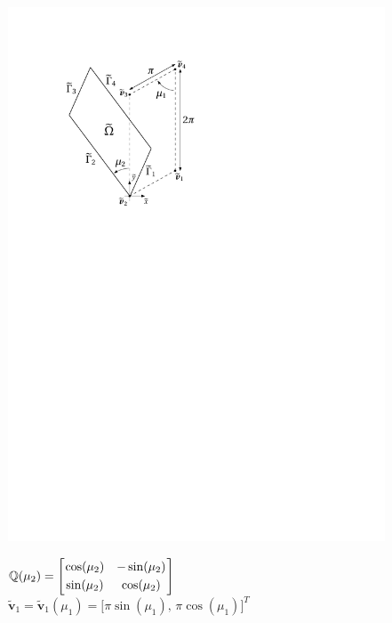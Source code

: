 \documentclass[12pt, a4paper, twoside, openright]{report}
\numberwithin{equation}{chapter}
\theoremstyle{theorem}
\theoremstyle{definition}
\theoremstyle{remark}
\theoremstyle{proposition}
\numberwithin{figure}{chapter}
\newcommand{\wt}[1]{\widetilde{#1}}
\newcommand{\bg}[1]{\boldsymbol{#1}}
\begin{document}
		\begin{figure}[b!]
			\begin{minipage}{0.4\textwidth}
				\center
				\includegraphics[scale = 0.7]{domain_square_ext}
			\end{minipage}
			\hfill
			\begin{minipage}{0.5\textwidth}
				$\mathbb{Q}(\mu_2) =
				\begin{bmatrix}
				\hspace*{-0.15cm}
				\begin{array}{cc}
					\cos(\mu_2) & -\sin(\mu_2) \\[0.1cm]
					\sin(\mu_2) & \cos(\mu_2)
				\end{array} 
				\hspace*{-0.15cm}
				\end{bmatrix}
				$ \\[0.3cm]
				$\wt{\bg{v}}_1 = \wt{\bg{v}}_1(\mu_1) = \big[ \pi \sin(\mu_1), \, \pi \cos(\mu_1) \big]^T$ \\[0.3cm]

\end{minipage}
\end{figure}
\end{document}
